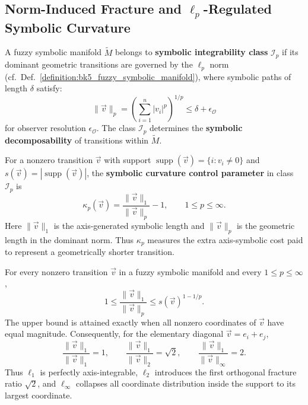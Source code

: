 \subsection{Norm-Induced Fracture and \texorpdfstring{$\ell_p$}{lp}-Regulated Symbolic Curvature}
\label{subsec:bk5_norm_induced_fracture_and_lp_regulated_symbolic_curvature}

\begin{definition}
\label{definition:bk5_symbolic_integrability_class}
A fuzzy symbolic manifold $\tilde{M}$ belongs to \textbf{symbolic integrability class} $\mathcal{I}_p$ if its dominant geometric transitions are governed by the $\ell_p$ norm (cf.~Def.~\ref{definition:bk5_fuzzy_symbolic_manifold}), where symbolic paths of length $\delta$ satisfy:
$$\|\vec{v}\|_p = \left(\sum_{i=1}^n |v_i|^p\right)^{1/p} \leq \delta + \epsilon_\mathcal{O}$$
for observer resolution $\epsilon_\mathcal{O}$. The class $\mathcal{I}_p$ determines the \textbf{symbolic decomposability} of transitions within $\tilde{M}$.
\end{definition}

\begin{definition}
\label{definition:bk5_symbolic_curvature_control}
For a nonzero transition $\vec{v}$ with support
$\operatorname{supp}(\vec{v})=\{i:v_i\neq0\}$ and
$s(\vec{v})=|\operatorname{supp}(\vec{v})|$, the \textbf{symbolic curvature
control parameter} in class $\mathcal{I}_p$ is
\[
\kappa_p(\vec{v})=\frac{\|\vec{v}\|_1}{\|\vec{v}\|_p}-1,\qquad 1\leq p\leq\infty.
\]
Here $\|\vec{v}\|_1$ is the axis-generated symbolic length and $\|\vec{v}\|_p$
is the geometric length in the dominant norm.  Thus $\kappa_p$ measures the
extra axis-symbolic cost paid to represent a geometrically shorter transition.
\end{definition}

\begin{theorem}
\label{theorem:bk5_lp_norm_fracture_hierarchy}
For every nonzero transition $\vec{v}$ in a fuzzy symbolic manifold and every
$1\leq p\leq\infty$,
\[
1\leq \frac{\|\vec{v}\|_1}{\|\vec{v}\|_p}
\leq s(\vec{v})^{1-1/p}.
\]
The upper bound is attained exactly when all nonzero coordinates of
$\vec{v}$ have equal magnitude.  Consequently, for the elementary diagonal
$\vec{v}=e_i+e_j$,
\[
\frac{\|\vec{v}\|_1}{\|\vec{v}\|_1}=1,\qquad
\frac{\|\vec{v}\|_1}{\|\vec{v}\|_2}=\sqrt{2},\qquad
\frac{\|\vec{v}\|_1}{\|\vec{v}\|_\infty}=2.
\]
Thus $\ell_1$ is perfectly axis-integrable, $\ell_2$ introduces the first
orthogonal fracture ratio $\sqrt{2}$, and $\ell_\infty$ collapses all
coordinate distribution inside the support to its largest coordinate.
\end{theorem}


